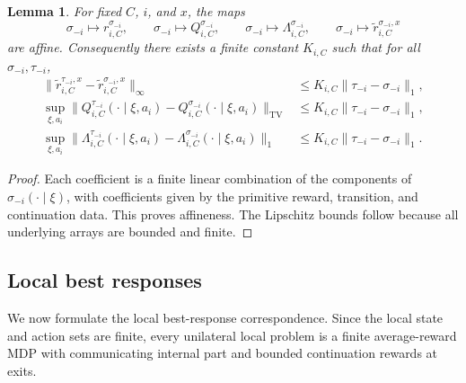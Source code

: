 \documentclass[12pt]{article}
\newtheorem{lemma}[theorem]{Lemma}
\theoremstyle{definition}
\newcommand{\1}{\mathbf{1}}
\begin{document}
\begin{lemma}
\label{lem:coeff-affine}
For fixed $C$, $i$, and $x$, the maps
\[
\sigma_{-i}\mapsto r_{i,C}^{\sigma_{-i}},
\qquad
\sigma_{-i}\mapsto Q_{i,C}^{\sigma_{-i}},
\qquad
\sigma_{-i}\mapsto \Lambda_{i,C}^{\sigma_{-i}},
\qquad
\sigma_{-i}\mapsto \widetilde r_{i,C}^{\sigma_{-i},x}
\]
are affine. Consequently there exists a finite constant $K_{i,C}$ such that for
all $\sigma_{-i},\tau_{-i}$,
\begin{align}
\|\widetilde r_{i,C}^{\tau_{-i},x}-\widetilde r_{i,C}^{\sigma_{-i},x}\|_\infty
&\le K_{i,C}\|\tau_{-i}-\sigma_{-i}\|_1,
\label{eq:r-lip}
\\
\sup_{\xi,a_i}\|Q_{i,C}^{\tau_{-i}}(\cdot\mid\xi,a_i)-Q_{i,C}^{\sigma_{-i}}(\cdot\mid\xi,a_i)\|_{\mathrm{TV}}
&\le K_{i,C}\|\tau_{-i}-\sigma_{-i}\|_1,
\label{eq:Q-lip}
\\
\sup_{\xi,a_i}\|\Lambda_{i,C}^{\tau_{-i}}(\cdot\mid\xi,a_i)-\Lambda_{i,C}^{\sigma_{-i}}(\cdot\mid\xi,a_i)\|_{1}
&\le K_{i,C}\|\tau_{-i}-\sigma_{-i}\|_1.
\label{eq:Lambda-lip}
\end{align}
\end{lemma}

\begin{proof}
Each coefficient is a finite linear combination of the components of
$\sigma_{-i}(\cdot\mid\xi)$, with coefficients given by the primitive reward,
transition, and continuation data. This proves affineness. The Lipschitz bounds
follow because all underlying arrays are bounded and finite.
\end{proof}

\subsection{Local best responses}

We now formulate the local best-response correspondence. Since the local state and
action sets are finite, every unilateral local problem is a finite average-reward
MDP with communicating internal part and bounded continuation rewards at exits.
\end{document}
